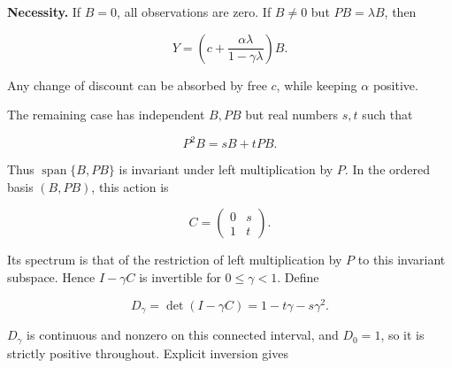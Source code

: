 \documentclass[11pt,a4paper]{article}
\begin{document}
\par
\noindent\begin{minipage}{\linewidth}

\textbf{Necessity.} If \(B=0\), all observations are zero. If \(B\ne0\)
but \(PB=\lambda B\), then

\[
Y=\left(c+\frac{\alpha\lambda}{1-\gamma\lambda}\right)B.
\]

\end{minipage}\par

Any change of discount can be absorbed by free \(c\), while keeping
\(\alpha\) positive.

\par
\noindent\begin{minipage}{\linewidth}

The remaining case has independent \(B,PB\) but real numbers \(s,t\)
such that

\[
P^2B=sB+tPB.
\]

\end{minipage}\par

\par
\noindent\begin{minipage}{\linewidth}

Thus \(\operatorname{span}\{B,PB\}\) is invariant under left
multiplication by \(P\). In the ordered basis \((B,PB)\), this action is

\[
C=\begin{pmatrix}0&s\\1&t\end{pmatrix}.
\]

\end{minipage}\par

\par
\noindent\begin{minipage}{\linewidth}

Its spectrum is that of the restriction of left multiplication by \(P\)
to this invariant subspace. Hence \(I-\gamma C\) is invertible for
\(0\le\gamma<1\). Define

\[
D_\gamma=\det(I-\gamma C)=1-t\gamma-s\gamma^2.
\]

\end{minipage}\par

\(D_\gamma\) is continuous and nonzero on this connected interval, and
\(D_0=1\), so it is strictly positive throughout. Explicit inversion
gives
\end{document}
